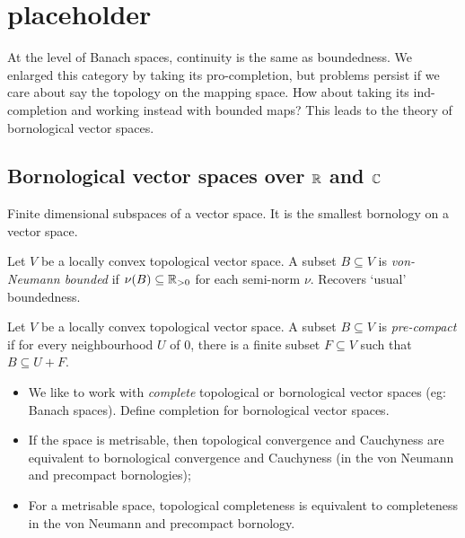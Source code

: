 

\section{placeholder}

At the level of Banach spaces, continuity is the same as boundedness. We enlarged this category by taking its pro-completion, but problems persist if we care about say the topology on the mapping space. How about taking its ind-completion and working instead with bounded maps? This leads to the theory of bornological vector spaces. 

\subsection{Bornological vector spaces over \(\mathbb R\) and \(\mathbb C\)}



\begin{example}
Finite dimensional subspaces of a vector space. It is the smallest bornology on a vector space.
\end{example}

\begin{example}
Let \(V\) be a locally convex topological vector space. A subset \(B\subseteq V\) is \emph{von-Neumann bounded} if \(\nu(B) \subseteq \mathbb R_{>0}\) for each semi-norm \(\nu\). Recovers `usual' boundedness.  
\end{example}

\begin{example}
Let \(V\) be a locally convex topological vector space. A subset \(B \subseteq V\) is \emph{pre-compact} if for every neighbourhood \(U\) of \(0\), there is a finite subset \(F \subseteq V\) such that \(B \subseteq U + F\).  
\end{example}



\begin{itemize}
\item We like to work with \emph{complete} topological or bornological vector spaces (eg: Banach spaces). Define completion for bornological vector spaces.
\item If the space is metrisable, then topological convergence and Cauchyness are equivalent to bornological convergence and Cauchyness (in the von Neumann and precompact bornologies);
\item For a metrisable space, topological completeness is equivalent to completeness in the von Neumann and precompact bornology.
\end{itemize}


